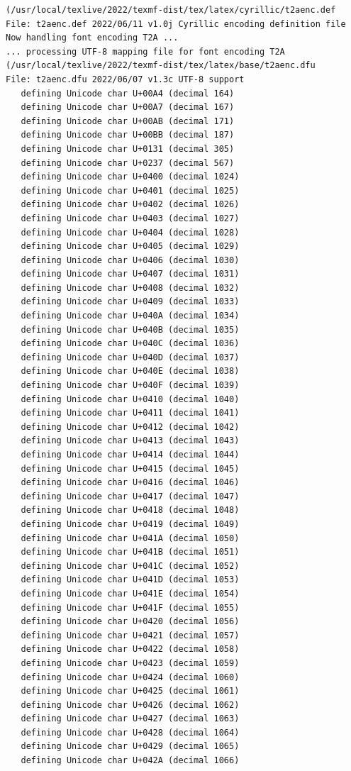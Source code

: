 \documentclass{article}
\begin{document}
\begin{verbatim}
(/usr/local/texlive/2022/texmf-dist/tex/latex/cyrillic/t2aenc.def
File: t2aenc.def 2022/06/11 v1.0j Cyrillic encoding definition file
Now handling font encoding T2A ...
... processing UTF-8 mapping file for font encoding T2A
(/usr/local/texlive/2022/texmf-dist/tex/latex/base/t2aenc.dfu
File: t2aenc.dfu 2022/06/07 v1.3c UTF-8 support
   defining Unicode char U+00A4 (decimal 164)
   defining Unicode char U+00A7 (decimal 167)
   defining Unicode char U+00AB (decimal 171)
   defining Unicode char U+00BB (decimal 187)
   defining Unicode char U+0131 (decimal 305)
   defining Unicode char U+0237 (decimal 567)
   defining Unicode char U+0400 (decimal 1024)
   defining Unicode char U+0401 (decimal 1025)
   defining Unicode char U+0402 (decimal 1026)
   defining Unicode char U+0403 (decimal 1027)
   defining Unicode char U+0404 (decimal 1028)
   defining Unicode char U+0405 (decimal 1029)
   defining Unicode char U+0406 (decimal 1030)
   defining Unicode char U+0407 (decimal 1031)
   defining Unicode char U+0408 (decimal 1032)
   defining Unicode char U+0409 (decimal 1033)
   defining Unicode char U+040A (decimal 1034)
   defining Unicode char U+040B (decimal 1035)
   defining Unicode char U+040C (decimal 1036)
   defining Unicode char U+040D (decimal 1037)
   defining Unicode char U+040E (decimal 1038)
   defining Unicode char U+040F (decimal 1039)
   defining Unicode char U+0410 (decimal 1040)
   defining Unicode char U+0411 (decimal 1041)
   defining Unicode char U+0412 (decimal 1042)
   defining Unicode char U+0413 (decimal 1043)
   defining Unicode char U+0414 (decimal 1044)
   defining Unicode char U+0415 (decimal 1045)
   defining Unicode char U+0416 (decimal 1046)
   defining Unicode char U+0417 (decimal 1047)
   defining Unicode char U+0418 (decimal 1048)
   defining Unicode char U+0419 (decimal 1049)
   defining Unicode char U+041A (decimal 1050)
   defining Unicode char U+041B (decimal 1051)
   defining Unicode char U+041C (decimal 1052)
   defining Unicode char U+041D (decimal 1053)
   defining Unicode char U+041E (decimal 1054)
   defining Unicode char U+041F (decimal 1055)
   defining Unicode char U+0420 (decimal 1056)
   defining Unicode char U+0421 (decimal 1057)
   defining Unicode char U+0422 (decimal 1058)
   defining Unicode char U+0423 (decimal 1059)
   defining Unicode char U+0424 (decimal 1060)
   defining Unicode char U+0425 (decimal 1061)
   defining Unicode char U+0426 (decimal 1062)
   defining Unicode char U+0427 (decimal 1063)
   defining Unicode char U+0428 (decimal 1064)
   defining Unicode char U+0429 (decimal 1065)
   defining Unicode char U+042A (decimal 1066)

\end{verbatim}
\end{document}
